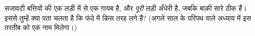 \begin{exercise}[$\star\star$]\label{exo:g3:first-electric-circuit:11}
सजावटी बत्तियों की एक लड़ी में से एक  ग़ायब है, और \emph{पूरी}
लड़ी अँधेरी है, जबकि बाक़ी सारे  ठीक हैं। इससे तुम्हें क्या पता
चलता है कि  फंदे में किस तरह लगे हैं? (अगले साल के परिपथ वाले
अध्याय में इस तरतीब को एक नाम मिलेगा।)
\end{exercise}
